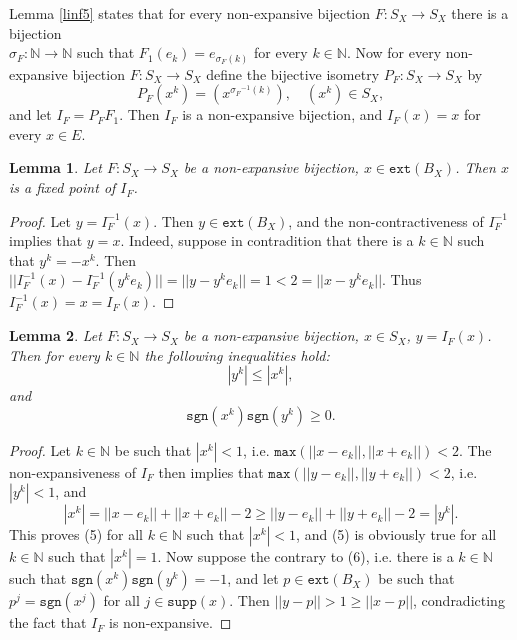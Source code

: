 \documentclass[reqno]{amsart}
\theoremstyle{plain}
\newtheorem{lemma}{Lemma}[section]
\theoremstyle{remark}
\theoremstyle{definition}
\newcommand{\N}{\mathbb N}
\begin{document}
Lemma \ref{linf5} states that for every non-expansive bijection $F: S_X\rightarrow S_X$ there is a bijection\\ $\sigma_F: \N \rightarrow \N$ such that $F_1(e_k)=e_{\sigma_F(k)}$ for every $k \in \N$. Now for every non-expansive bijection $F: S_X\rightarrow S_X$ define the bijective isometry $P_F:S_X\rightarrow S_X$ by
    \[P_F(x^k)=(x^{{\sigma_F}^{-1}(k)}), \quad (x^k) \in S_X,\]
    and let $I_F=P_FF_1$. Then $I_F$ is a non-expansive bijection, and $I_F(x)=x$ for every $x \in E$.

\begin{lemma}\label{linf6}
    Let $F: S_X\rightarrow S_X$ be a non-expansive bijection, $x \in \mathtt{ext}(B_X)$. Then $x$ is a fixed point of $I_F$.
\end{lemma}

\begin{proof}
    Let $y=I_F^{-1}(x)$. Then $y \in \mathtt{ext}(B_X)$, and the non-contractiveness of $I_F^{-1}$ implies that $y=x$. Indeed, suppose in contradition that there is a $k \in \N$ such that $y^k=-x^k$. Then $||I_F^{-1}(x)-I_F^{-1}(y^ke_k)||=||y-y^ke_k||=1<2=||x-y^ke_k||$. Thus $I_F^{-1}(x)=x=I_F(x)$. 
\end{proof}

\begin{lemma}\label{linf7}
    Let $F: S_X\rightarrow S_X$ be a non-expansive bijection, $x\in S_X$, $y=I_F(x)$. Then for every $k \in \N$ the following inequalities hold:
    \begin{equation}
        |y^k|\leq |x^k|,
    \end{equation}
    and
    \begin{equation}
        \mathtt{sgn}(x^k)  \mathtt{sgn}(y^k) \geq 0.
    \end{equation}
\end{lemma}

\begin{proof}
    Let $k \in \N$ be such that $|x^k|<1$, i.e. $\mathtt{max}(||x-e_k||,||x+e_k||)<2$. The non-expansiveness of $I_F$ then implies that $\mathtt{max}(||y-e_k||,||y+e_k||)<2$, i.e. $|y^k|<1$, and 
    \[|x^k|=||x-e_k||+||x+e_k||-2\geq ||y-e_k||+||y+e_k||-2=|y^k|.\]
    This proves (5) for all $k\in \N$ such that $|x^k|<1$, and (5) is obviously true for all $k\in \N$ such that $|x^k|=1$. Now suppose the contrary to (6), i.e. there is a $k\in \N$ such that $\mathtt{sgn}(x^k)  \mathtt{sgn}(y^k)=-1$, and let $p \in \mathtt{ext}(B_X)$ be such that $p^j=\mathtt{sgn}(x^j)$ for all $j \in \mathtt{supp}(x)$. Then $||y-p||>1\geq||x-p||$, condradicting the fact that $I_F$ is non-expansive.
\end{proof}
\end{document}
